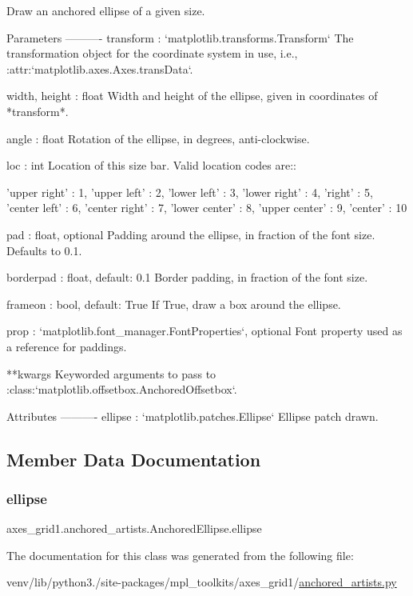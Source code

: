 \begin{DoxyVerb}Draw an anchored ellipse of a given size.

Parameters
----------
transform : `matplotlib.transforms.Transform`
    The transformation object for the coordinate system in use, i.e.,
    :attr:`matplotlib.axes.Axes.transData`.

width, height : float
    Width and height of the ellipse, given in coordinates of
    *transform*.

angle : float
    Rotation of the ellipse, in degrees, anti-clockwise.

loc : int
    Location of this size bar. Valid location codes are::

'upper right'  : 1,
'upper left'   : 2,
'lower left'   : 3,
'lower right'  : 4,
'right'        : 5,
'center left'  : 6,
'center right' : 7,
'lower center' : 8,
'upper center' : 9,
'center'       : 10

pad : float, optional
    Padding around the ellipse, in fraction of the font size. Defaults
    to 0.1.

borderpad : float, default: 0.1
    Border padding, in fraction of the font size.

frameon : bool, default: True
    If True, draw a box around the ellipse.

prop : `matplotlib.font_manager.FontProperties`, optional
    Font property used as a reference for paddings.

**kwargs
    Keyworded arguments to pass to
    :class:`matplotlib.offsetbox.AnchoredOffsetbox`.

Attributes
----------
ellipse : `matplotlib.patches.Ellipse`
    Ellipse patch drawn.
\end{DoxyVerb}
 

\subsection{Member Data Documentation}
\mbox{\label{classaxes__grid1_1_1anchored__artists_1_1AnchoredEllipse_aa81657b8a26d464cc257f96b244ac560}} 
\subsubsection{\texorpdfstring{ellipse}{ellipse}}
{\footnotesize\ttfamily axes\+\_\+grid1.\+anchored\+\_\+artists.\+Anchored\+Ellipse.\+ellipse}



The documentation for this class was generated from the following file\+:\begin{DoxyCompactItemize}
\item 
venv/lib/python3./site-\/packages/mpl\+\_\+toolkits/axes\+\_\+grid1/\hyperlink{_2anchored__artists_8py}{anchored\+\_\+artists.\+py}\end{DoxyCompactItemize}
